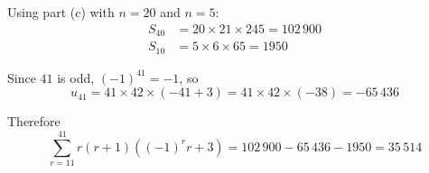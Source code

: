 \documentclass[leqno]{article}
\begin{document}
\begin{enumerate}[
  label=\textbf{\arabic*.},
  leftmargin=*,
  topsep=0pt,
  partopsep=0pt,
  parsep=0pt
]
\begin{djsSolution}
\begin{enumerate}[label=\textbf{(\alph*)}, start=1]
Using part (c) with \(n=20\) and \(n=5\):
\begin{align*}
S_{40}&=20\times21\times245=102\,900\\
S_{10}&=5\times6\times65=1950
\end{align*}

Since \(41\) is odd, \((-1)^{41}=-1\), so
\[
u_{41}=41\times42\times(-41+3)=41\times42\times(-38)=-65\,436
\]

Therefore
\[
\sum_{r=11}^{41} r(r+1)\left((-1)^r r+3\right)=102\,900-65\,436-1950=35\,514
\]

\end{enumerate}
\end{djsSolution}

\end{enumerate}
\end{document}
